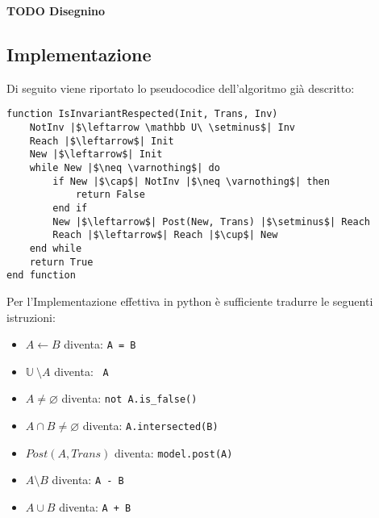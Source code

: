 \documentclass[12pt]{article}
\begin{document}
    \textbf{TODO Disegnino}

    \subsection{Implementazione}
    Di seguito viene riportato lo pseudocodice dell'algoritmo già descritto:

    \begin{verbatim}
function IsInvariantRespected(Init, Trans, Inv)
    NotInv |$\leftarrow \mathbb U\ \setminus$| Inv
    Reach |$\leftarrow$| Init
    New |$\leftarrow$| Init
    while New |$\neq \varnothing$| do
        if New |$\cap$| NotInv |$\neq \varnothing$| then
            return False
        end if
        New |$\leftarrow$| Post(New, Trans) |$\setminus$| Reach
        Reach |$\leftarrow$| Reach |$\cup$| New
    end while
    return True
end function
    \end{verbatim}

    Per l'Implementazione effettiva in python è sufficiente tradurre le seguenti istruzioni:
    \begin{itemize}
        \item $A \leftarrow B$ diventa: \texttt{A = B}
        \item $\mathbb U\ \setminus A$ diventa: \texttt{~A}
        \item $A \neq \varnothing$ diventa: \texttt{not A.is_false()}
        \item $A \cap B \neq \varnothing$ diventa: \texttt{A.intersected(B)}
        \item $Post(A, Trans)$ diventa: \texttt{model.post(A)}
        \item $A \setminus B$ diventa: \texttt{A - B}
        \item $A \cup B$ diventa: \texttt{A + B}
    \end{itemize}
\end{document}
